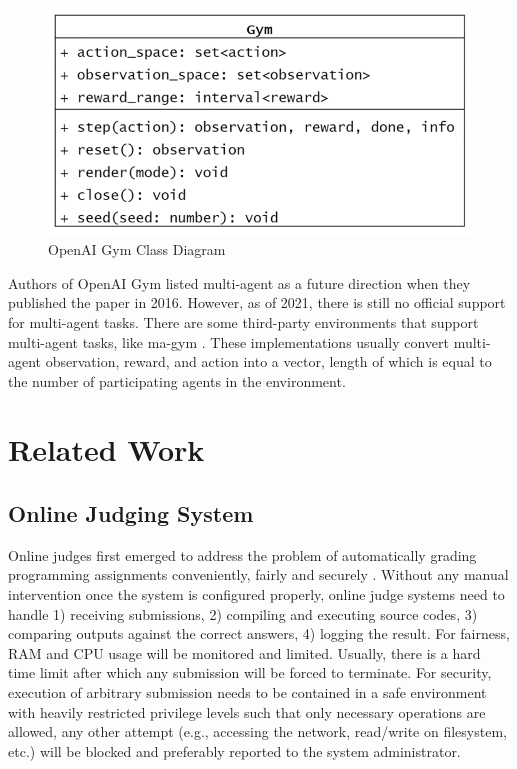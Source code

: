 \begin{figure}[htp]
    \centering
    \includegraphics{images/gym-class.png}
    \caption{OpenAI Gym Class Diagram}
    \label{fig:gym-class}
\end{figure}

Authors of OpenAI Gym listed multi-agent as a future direction when they published the paper in 2016. However, as of 2021, there is still no official support for multi-agent tasks. There are some third-party environments that support multi-agent tasks, like ma-gym \cite{magym}. These implementations usually convert multi-agent observation, reward, and action into a vector, length of which is equal to the number of participating agents in the environment.

\section{Related Work}

\subsection{Online Judging System}
Online judges first emerged to address the problem of automatically grading programming assignments conveniently, fairly and securely \cite{RN4}. Without any manual intervention once the system is configured properly, online judge systems need to handle 1) receiving submissions, 2) compiling and executing source codes, 3) comparing outputs against the correct answers, 4) logging the result. For fairness, RAM and CPU usage will be monitored and limited. Usually, there is a hard time limit after which any submission will be forced to terminate. For security, execution of arbitrary submission needs to be contained in a safe environment with heavily restricted privilege levels such that only necessary operations are allowed, any other attempt (e.g., accessing the network, read/write on filesystem, etc.) will be blocked and preferably reported to the system administrator. 

